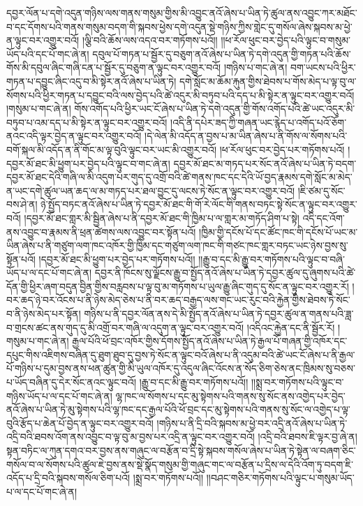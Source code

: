 དབྱར་ལོན་པ་དགེ་འདུན་གཉིས་ལས་གནས་གསུམ་གྱིས་མི་འབྱུང་ནའོ་ཞེས་པ་ཡིན་ཏེ་ཚུལ་ནས་འབྱུང་ཀར་མཐོང་བ་དང་དོགས་པའི་གནས་གསུམ་བདག་གི་སྐབས་ཕྱེས་དགེ་འདུན་སྡེ་གཉིས་ཀྱིས་གླེང་དུ་གསོལ་ཞེས་སྐབས་མ་ཕྱེ་ན་ལྟུང་བར་འགྱུར་བའོ། །ལྕི་བའི་ཆོས་ལས་འདའ་བར་གཏོགས་པའོ།། །།ཕ་རོལ་ཕུང་བར་བྱེད་པའི་ལྟུང་བ་གསུམ་ཡོད་པའི་དང་པོ་གང་ཞེ་ན། དབུལ་པོ་གཏན་པ་སྦྱོར་དུ་བཅུག་ནའོ་ཞེས་པ་ཡིན་ཏེ་དགེ་འདུན་གྱི་གཏན་པའི་ཆོས་གོས་མི་དབུལ་ཞིང་གཞི་ངན་པ་སྦྱོར་དུ་བཅུག་ན་ལྟུང་བར་འགྱུར་བའོ། །གཉིས་པ་གང་ཞེ་ན། བག་ཡངས་པའི་ཕྱིར་གཏན་པ་དབྱུང་ཞིང་འདུ་བ་མི་སྟེར་ནའོ་ཞེས་པ་ཡིན་ཏེ། དགེ་སློང་མ་ཆོམ་རྐུན་གྱིས་ཐེབས་པ་གོས་མེད་པ་ལྟ་བུ་ལ་སོགས་པའི་ཕྱིར་གཏན་པ་དབྱུང་བའི་ལས་བྱེད་པའི་ཚེ་འདུར་མི་བཏུབ་པའི་དད་པ་མི་སྟེར་ན་ལྟུང་བར་འགྱུར་བའོ། །གསུམ་པ་གང་ཞེ་ན། གོས་འགོད་པའི་ཕྱིར་ཡང་ངོ་ཞེས་པ་ཡིན་ཏེ་དགེ་འདུན་གྱི་གོས་འགོད་པའི་ཚེ་ཡང་འདུར་མི་བཏུབ་པ་འམ་དད་པ་མི་སྟེར་ན་ལྟུང་བར་འགྱུར་བའོ། །འདི་ནི་དཔེར་ཟད་ཀྱི་གཞན་ཡང་རྙེད་པ་འགོད་པའོ་ཅོག་ནའང་འདི་ལྟར་བྱེད་ན་ལྟུང་བར་འགྱུར་བའོ། །དེ་ལེན་མི་འདོད་ན་བྱས་པ་མ་ཡིན་ཞེས་པ་ནི་གོས་ལ་སོགས་པའི་བགོ་སྐལ་མི་འདོད་ན་ནི་གོང་མ་ལྟ་བུའི་ལྟུང་བར་ཡང་མི་འགྱུར་བའོ། །ཕ་རོལ་ཕུང་བར་བྱེད་པར་གཏོགས་པའོ། །དབྱར་མོ་ཐང་མི་ཕྱུག་པར་བྱེད་པའི་ལྟུང་བ་གང་ཞེ་ན། དབྱར་མོ་ཐང་མ་གཏད་པར་སོང་ནའོ་ཞེས་པ་ཡིན་ཏེ་བདག་དབྱར་མོ་ཐང་དེའི་གཞི་ལ་མི་འདུག་པར་གུད་དུ་འགྲོ་བའི་ཚེ་གནས་ཁང་དང་དེའི་ཡོ་བྱད་རྣམས་དགེ་སློང་མ་མེད་ན་ཡང་དགེ་ཚུལ་ཡན་ཆད་ལ་མ་གཏད་པར་ཐལ་བྱུང་དུ་ལངས་ཏེ་སོང་ན་ལྟུང་བར་འགྱུར་བའོ། །ཇི་ཙམ་དུ་སོང་བས་ཤེ་ན། ཉེ་སྤྱོད་བཏང་ནའོ་ཞེས་པ་ཡིན་ཏེ་དབྱར་མོ་ཐང་གི་གོ་རེ་ལོང་གི་གནས་བཏང་སྟེ་སོང་ན་ལྟུང་བར་འགྱུར་བའོ། །དབྱར་མོ་ཐང་གླར་མི་སྦྱིན་ཞེས་པ་ནི་དབྱར་མོ་ཐང་གི་ཁྱིམ་པ་ལ་གླར་མ་གཏོད་ཤིག་པ་སྟེ། འདི་དང་འོག་ནས་འབྱུང་བ་རྣམས་ནི་ཕྲན་ཚེགས་ལས་འབྱུང་བར་སྟོན་པའོ། །ཁྱིམ་གྱི་དངོས་པོ་དང་ཚོང་ཁང་གི་དངོས་པོ་ཡང་མ་ཡིན་ཞེས་པ་ནི་གཙུག་ལག་ཁང་འཁོར་གྱི་ཁྱིམ་དང་གཙུག་ལག་ཁང་གི་གཙང་ཁང་གླར་བཏང་ཡང་ཉེས་བྱས་སུ་སྟོན་པའོ། །དབྱར་མོ་ཐང་མི་ཕྱུག་པར་བྱེད་པར་གཏོགས་པའོ།། །།རྒྱུ་བ་དང་མི་རྒྱུ་བར་གཏོགས་པའི་ལྟུང་བ་བཞི་ཡོད་པ་ལ་དང་པོ་གང་ཞེ་ན། དབྱར་ནི་ཁོངས་སུ་ལྗོངས་རྒྱུ་བ་སྤྱོད་ནའོ་ཞེས་པ་ཡིན་ཏེ་དབྱར་ཚུལ་དུ་ཞུགས་པའི་ཚེ་དོན་གྱི་ཕྱིར་ཞག་བདུན་བྱིན་གྱིས་བརླབས་པ་ལྟ་བུ་མ་གཏོགས་པ་ཡུལ་རྒྱུ་ཞིང་གུད་དུ་སོང་ན་ལྟུང་བར་འགྱུར་རོ། །བར་ཆད་ཉེ་བར་འོངས་པ་ནི་ཉེས་མེད་ཅེས་པ་ནི་བར་ཆད་བརྒྱད་ལས་གང་ཡང་རུང་བའི་རྐྱེན་གྱིས་ཐེབས་ཏེ་སོང་བ་ནི་ཉེས་མེད་པར་སྟོན། གཉིས་པ་ནི་དབྱར་ལོན་ནས་དེ་མི་སྤྱོད་ནའོ་ཞེས་པ་ཡིན་ཏེ་དབྱར་ཚུལ་ན་གནས་པའི་ཟླ་བ་གྲངས་ཚང་ནས་གུད་དུ་མི་འགྲོ་བར་གཞི་ལ་འདུག་ན་ལྟུང་བར་འགྱུར་བའོ། །འདིའང་རྐྱེན་དང་ནི་སྦྱོར་རོ། །གསུམ་པ་གང་ཞེ་ན། རྒྱལ་པོའི་ཕོ་བྲང་འཁོར་གྱིས་དོགས་སྤྱོད་ནའོ་ཞེས་པ་ཡིན་ཏེ་རྒྱལ་པོ་གཞན་གྱི་འཁོར་དང་དཔུང་གིས་འཇིགས་བཞིན་དུ་ཐུག་ཐུབ་དུ་བྱས་ཏེ་སོང་ན་ལྟུང་བའོ་ཞེས་པ་ནི་འདུམ་བའི་ཚེ་ཡང་ངོ་ཞེས་པ་ནི་རྒྱལ་པོ་གཉིས་པ་དུམ་བྱས་ནས་ཕན་ཚུན་གྱི་མི་ཡུལ་འཁོར་དུ་འདུལ་ཞིང་འོངས་ན་སོད་ཅིག་ཅེས་ནང་ཁྲིམས་སུ་བཅས་པ་ཡོད་བཞིན་དུ་དེར་སོང་ནའང་ལྟུང་བའོ། །རྒྱུ་བ་དང་མི་རྒྱུ་བར་གཏོགས་པའོ།། །།སྨྲ་བར་གཏོགས་པའི་ལྟུང་བ་གཉིས་ཡོད་པ་ལ་དང་པོ་གང་ཞེ་ན། ལྷ་ཁང་ལ་སོགས་པ་དང་མུ་སྟེགས་པའི་གནས་སུ་སོང་ནས་འགྱེད་པར་བྱེད་ནའོ་ཞེས་པ་ཡིན་ཏེ་མུ་སྟེགས་པའི་ལྷ་ཁང་དང་རྒྱལ་པོའི་ཕོ་བྲང་དང་མུ་སྟེགས་པའི་གནས་སུ་སོང་ལ་འགྱེད་པ་ལྟ་བུའི་རྩོད་པ་ཆེན་པོ་བྱེད་ན་ལྟུང་བར་འགྱུར་བའོ། །གཉིས་པ་ནི་དྲི་བའི་སྐབས་མ་ཕྱེ་བར་འདྲི་ནའོ་ཞེས་པ་ཡིན་ཏེ་འདྲི་བའི་ཐབས་འོག་ནས་འབྱུང་བ་ལྟ་བུ་མ་བྱས་པར་འདྲི་ན་ལྟུང་བར་འགྱུར་བའོ། །འདྲི་བའི་ཐབས་ཇི་ལྟར་བྱ་ཞེ་ན། སྟན་བཏིང་ལ་ཀུན་དགའ་བར་བྱས་ནས་གཞུང་ལ་བརྩོན་བ་དྲི་སྟེ་སྐབས་གསོལ་ཞེས་པ་ཡིན་ཏེ་སྟེན་ལ་བཞག་ཅིང་གསོལ་བ་ལ་སོགས་པའི་ཚུལ་ཇེ་བྱས་ནས་སྡེ་སྣོད་གསུམ་གྱི་གཞུང་གང་ལ་བརྩོན་པ་དྲིས་ལ་དེའི་འོག་ཏུ་བདག་ཇི་འདོད་པ་དྲི་བའི་སྐབས་གསོལ་ཅིག་པའོ། །སྨྲ་བར་གཏོགས་པའོ།། །།བཤང་གཅིར་གཏོགས་པའི་ལྟུང་པ་གསུམ་ཡོད་པ་ལ་དང་པོ་གང་ཞེ་ན། 